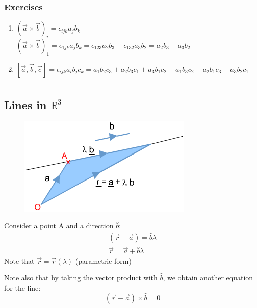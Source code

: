 \documentclass[a4paper, 11pt, normalem]{report}
\begin{document}
\subsection{Exercises}
\begin{enumerate}
    \item $(\vec{a} \times \vec{b})_i = \epsilon_{ijk}a_{j}b_{k}$ \\
          $(\vec{a} \times \vec{b})_1 = \epsilon_{1jk}a_{j}b_{k} = \epsilon_{123}a_{2}b_{3} + \epsilon_{132}a_{3}b_{2} = a_{2}b_{3} - a_{3}b_{2}$
    \item $[\vec{a},\vec{b},\vec{c}] = \epsilon_{ijk}a_{i}b_{j}c_{k} =  a_{1}b_{2}c_{3} + a_{2}b_{3}c_{1} + a_{3}b_{1}c_{2} - a_{1}b_{3}c_{2} - a_{2}b_{1}c_{3} - a_{3}b_{2}c_{1}$
\end{enumerate}

\chapter{}
\section{Lines in $\mathbb{R}^3$}
\begin{figure}
    \begin{center}
        \includegraphics[scale=0.5]{EqLine.png}
    \end{center}
\end{figure}
Consider a point A and a direction $\hat{b}$:
\begin{gather*}
    (\vec{r} - \vec{a}) = \hat{b}\lambda \\
    \vec{r} = \vec{a} + \hat{b}\lambda
\end{gather*}
Note that $\vec{r} =\vec{r}(\lambda)$ (parametric form)

Note also that by taking the vector product with $\hat{b}$, we obtain another equation for the line:
\begin{equation*}
    (\vec{r} - \vec{a}) \times \hat{b} = 0
\end{equation*}
\end{document}
